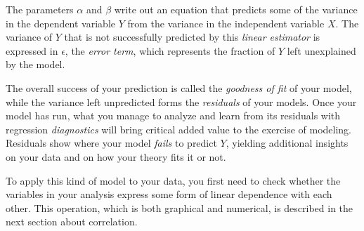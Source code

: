 The parameters $\alpha$ and $\beta$ write out an equation that predicts some of the variance in the dependent variable $Y$ from the variance in the independent variable $X$. The variance of $Y$ that is not successfully predicted by this \emph{linear estimator} is expressed in $\epsilon$, the \emph{error term}, which represents the fraction of $Y$ left unexplained by the model.

The overall success of your prediction is called the \emph{goodness of fit} of your model, while the variance left unpredicted forms the \emph{residuals} of your models. Once your model has run, what you manage to analyze and learn from its residuals with regression \emph{diagnostics} will bring critical added value to the exercise of modeling. Residuals show where your model \emph{fails} to predict $Y$, yielding additional insights on your data and on how your theory fits it or not.

To apply this kind of model to your data, you first need to check whether the variables in your analysis express some form of linear dependence with each other. This operation, which is both graphical and numerical, is described in the next section about correlation.

%
%





